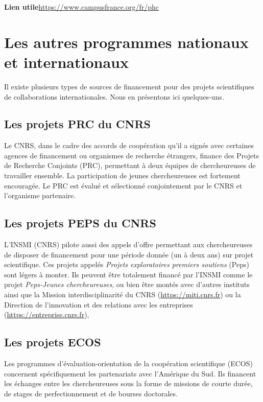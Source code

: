 \textbf{Lien utile\hspace{.5em}}\url{https://www.campusfrance.org/fr/phc}

\section{Les autres programmes nationaux et internationaux}
Il existe plusieurs types de sources de financement pour des projets
scientifiques de collaborations internationales. Nous en pr\'esentons
ici quelques-uns.

\subsection{Les projets PRC du CNRS}

Le CNRS, dans le cadre des accords de coop{\'e}ration qu'il a sign{\'e}s avec certaines agences de financement ou organismes de recherche {\'e}trangers, finance des Projets de Recherche Conjoints (PRC), permettant {\`a} deux {\'e}quipes de chercheur\mp euse\mp s de travailler ensemble. 
La participation de jeunes chercheur\mp euse\mp s est fortement encourag{\'e}e.
Le PRC est {\'e}valu{\'e} et s{\'e}lectionn{\'e} conjointement par le CNRS et l’organisme partenaire.


\subsection{Les projets PEPS du CNRS}

L'INSMI (CNRS) pilote aussi des appels d'offre permettant aux chercheur\mp euse\mp s de disposer de financement pour une p\'eriode donn\'ee (un \`a deux ans) sur projet scientifique. 
Ces projets appel\'es {\it Projets exploratoires premiers soutiens} (Peps) sont l\'egers \`a monter. 
Ils peuvent \^etre totalement financ\'e par l'INSMI comme le projet {\it Peps-Jeunes chercheur\mp euse\mp s}, ou bien \^etre mont\'es avec 
d'autres instituts ainsi que la Mission interdisciplinarit\'e du CNRS (\url{https://miti.cnrs.fr}) ou la Direction de l'innovation et des relations avec les entreprises (\url{https://entreprise.cnrs.fr}), 


\subsection{Les projets ECOS}
Les programmes d'\'evaluation-orientation de la coop\'eration
scientifique (ECOS) concernent sp\'eci\-fi\-que\-ment les
partenariats avec l'Am\'erique du Sud. Ils financent les \'echanges
entre les chercheur\mp euse\mp s sous la forme de missions de courte dur\'ee, de
stages de perfectionnement et de bourses doctorales.

